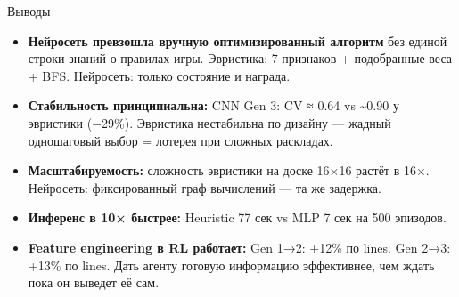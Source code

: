 \documentclass[aspectratio=169]{beamer}
\begin{document}
	\begin{frame}{Выводы}
		\begin{itemize}
			\item \textbf{Нейросеть превзошла вручную оптимизированный алгоритм} без единой строки знаний о правилах игры.
			Эвристика: 7 признаков + подобранные веса + BFS.
			Нейросеть: только состояние и награда.
			
			\item \textbf{Стабильность принципиальна:} CNN Gen 3: CV ≈ 0.64 vs \textasciitilde0.90 у эвристики (−29\%).
			Эвристика нестабильна по дизайну — жадный одношаговый выбор = лотерея при сложных раскладах.
			
			\item \textbf{Масштабируемость:} сложность эвристики на доске 16×16 растёт в 16×.
			Нейросеть: фиксированный граф вычислений — та же задержка.
			
			\item \textbf{Инференс в 10× быстрее:} Heuristic 77 сек vs MLP 7 сек на 500 эпизодов.
			
			\item \textbf{Feature engineering в RL работает:}
			Gen 1→2: +12\% по lines.
			Gen 2→3: +13\% по lines.
			Дать агенту готовую информацию эффективнее, чем ждать пока он выведет её сам.
		\end{itemize}
	\end{frame}
	
\end{document}
